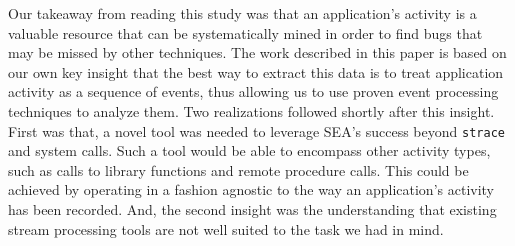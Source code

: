 Our takeaway
from reading this study
was that an application's activity
is a valuable resource that can be systematically mined
in order to find bugs
that may be missed by other techniques.
The work described in this paper
is based on our own key insight that the best way to extract this data
is to treat application activity
as a sequence of events,
thus allowing us to use
proven event processing techniques
to analyze them.
Two realizations followed shortly after this
insight.
First was that, a novel tool was needed to leverage
SEA's success beyond {\tt strace} and system calls. Such a tool would be able to encompass other activity types,
such as calls to library functions
and remote procedure calls.
This could be achieved by operating in a fashion agnostic to the way an application's activity has been recorded.
And, the second insight was the understanding that existing
stream processing tools
are not well suited to the
task we had in mind.



